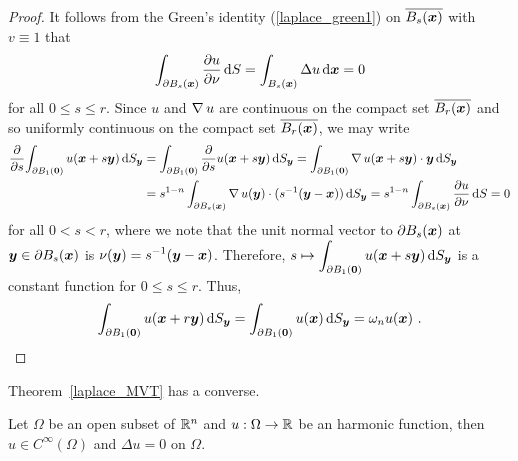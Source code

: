 \begin{proof}
It follows from the Green's identity (\ref{laplace_green1}) on
$\displaystyle \overline{B_s(\VEC{x})}$ with $v \equiv 1$ that
\begin{equation} \label{MVTequ1}
\int_{\partial B_s(\VEC{x})} \pdydx{u}{\nu} \dx{S}
= \int_{B_s(\VEC{x})} \Delta u \dx{\VEC{x}} = 0
\end{equation}
for all $0 \leq s \leq r$.  Since $u$ and
$\graD u$ are continuous on the compact set
$\overline{B_r(\VEC{x})}$ and so uniformly continuous on the compact
set $\overline{B_r(\VEC{x})}$, we may write
\begin{align*}
\pdfdx{ \int_{\partial B_1(\VEC{0})} u(\VEC{x} + s\VEC{y}) \dss{S}{y} }{s}
&= \int_{\partial B_1(\VEC{0})} \pdfdx{u(\VEC{x} + s\VEC{y})}{s} \dss{S}{y}
= \int_{\partial B_1(\VEC{0})} \graD u(\VEC{x} + s\VEC{y}) \cdot
\VEC{y} \dss{S}{y} \\
& = s^{1-n}\int_{\partial B_s(\VEC{x})} \graD u(\VEC{y}) \cdot
(s^{-1}(\VEC{y}-\VEC{x})) \dss{S}{y}
= s^{1-n} \int_{\partial B_s(\VEC{x})}
\pdydx{u}{\nu} \dx{S} = 0
\end{align*}
for all $0<s<r$, where we note that the unit normal vector to
$\partial B_s(\VEC{x})$ at $\VEC{y} \in \partial B_s(\VEC{x})$ is
$\displaystyle \nu(\VEC{y}) = s^{-1}(\VEC{y}-\VEC{x})$.
Therefore,
$\displaystyle s \mapsto
\int_{\partial B_1(\VEC{0})} u(\VEC{x} + s\VEC{y}) \dss{S}{y}$
is a constant function for $0 \leq s \leq r$.  Thus,
\[
\int_{\partial B_1(\VEC{0})} u(\VEC{x} + r\VEC{y}) \dss{S}{y}
= \int_{\partial B_1(\VEC{0})} u(\VEC{x}) \dss{S}{y}
= \omega_n u(\VEC{x}) \ . \qedhere
\]
\end{proof}

Theorem~\ref{laplace_MVT} has a converse.

\begin{theorem} \label{laplace_MVT_conv}
Let $\Omega$ be an open subset of $\RR^n$ and $u:\Omega \rightarrow \RR$
be an harmonic function, then $u \in C^\infty(\Omega)$ and
$\Delta u = 0$ on $\Omega$.
\end{theorem}

